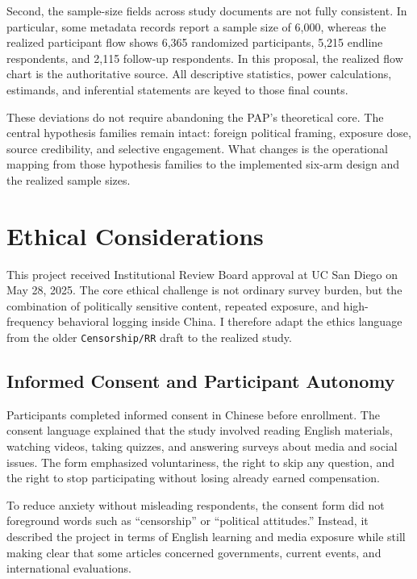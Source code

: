 \documentclass[12pt,american]{article}
\begin{document}
Second, the sample-size fields across study documents are not fully consistent. In particular, some metadata records report a sample size of 6,000, whereas the realized participant flow shows 6,365 randomized participants, 5,215 endline respondents, and 2,115 follow-up respondents. In this proposal, the realized flow chart is the authoritative source. All descriptive statistics, power calculations, estimands, and inferential statements are keyed to those final counts.

These deviations do not require abandoning the PAP's theoretical core. The central hypothesis families remain intact: foreign political framing, exposure dose, source credibility, and selective engagement. What changes is the operational mapping from those hypothesis families to the implemented six-arm design and the realized sample sizes.

\section{Ethical Considerations}

This project received Institutional Review Board approval at UC San Diego on May 28, 2025. The core ethical challenge is not ordinary survey burden, but the combination of politically sensitive content, repeated exposure, and high-frequency behavioral logging inside China. I therefore adapt the ethics language from the older \texttt{Censorship/RR} draft to the realized study.

\subsection{Informed Consent and Participant Autonomy}

Participants completed informed consent in Chinese before enrollment. The consent language explained that the study involved reading English materials, watching videos, taking quizzes, and answering surveys about media and social issues. The form emphasized voluntariness, the right to skip any question, and the right to stop participating without losing already earned compensation.

To reduce anxiety without misleading respondents, the consent form did not foreground words such as ``censorship'' or ``political attitudes.'' Instead, it described the project in terms of English learning and media exposure while still making clear that some articles concerned governments, current events, and international evaluations.
\end{document}
